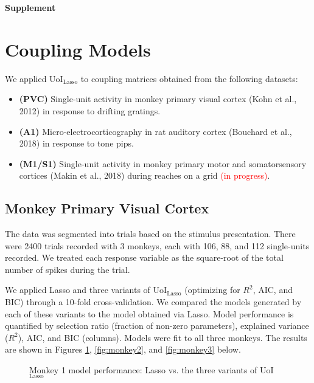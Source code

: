 \documentclass[11pt]{article}
\begin{document}
\begin{center}
	\textbf{\LARGE Supplement}
\end{center}

\section{Coupling Models}
We applied UoI$_{\text{Lasso}}$ to coupling matrices obtained from the following datasets:
\begin{itemize}
	\item \textbf{(PVC)} Single-unit activity in monkey primary visual cortex (Kohn et al., 2012) in response to drifting gratings.
	\item \textbf{(A1)} Micro-electrocorticography in rat auditory cortex (Bouchard et al., 2018) in response to tone pips.
	\item \textbf{(M1/S1)} Single-unit activity in monkey primary motor and somatorsensory cortices (Makin et al., 2018) during reaches on a grid \textcolor{red}{(in progress)}.
\end{itemize}

\subsection{Monkey Primary Visual Cortex}
The data was segmented into trials based on the stimulus presentation. There were 2400 trials recorded with 3 monkeys, each with 106, 88, and 112 single-units recorded. We treated each response variable as the square-root of the total number of spikes during the trial. 

We applied Lasso and three variants of UoI$_{\text{Lasso}}$ (optimizing for $R^2$, AIC, and BIC) through a 10-fold cross-validation. We compared the models generated by each of these variants to the model obtained via Lasso. Model performance is quantified by selection ratio (fraction of non-zero parameters), explained variance ($R^2$), AIC, and BIC (columns). Models were fit to all three monkeys. The results are shown in Figures \ref{fig:monkey1}, \ref{fig:monkey2}, and \ref{fig:monkey3} below.

\begin{figure}[H]
	\centering
	\vspace{-10pt}
	\caption{Monkey 1 model performance: Lasso vs. the three variants of UoI$_{\text{Lasso}}$}
	\label{fig:monkey1}
\end{figure}
\end{document}
